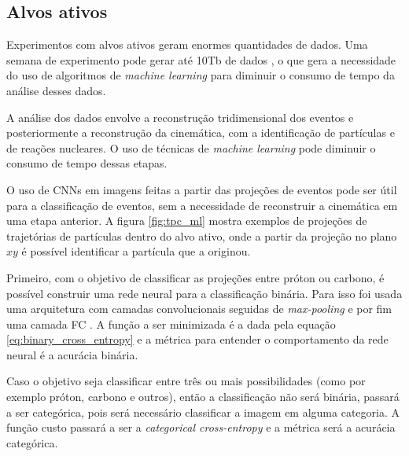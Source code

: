 \documentclass[a4paper,12pt,oneside]{book}
\begin{document}
\begin{appendices}
\section{Alvos ativos}

\par Experimentos com alvos ativos geram enormes quantidades de dados. Uma semana de experimento pode gerar até 10Tb de dados \cite{KUCHERAML}, o que gera a necessidade do uso de algoritmos de \textit{machine learning} para diminuir o consumo de tempo da análise desses dados.

\par A análise dos dados envolve a reconstrução tridimensional dos eventos e posteriormente a reconstrução da cinemática, com a identificação de partículas e de reações nucleares. O uso de técnicas de \textit{machine learning} pode diminuir o consumo de tempo dessas etapas.

\par O uso de CNNs em imagens feitas a partir das projeções de eventos pode ser útil para a classificação de eventos, sem a necessidade de reconstruir a cinemática em uma etapa anterior. A figura \ref{fig:tpc_ml} mostra exemplos de projeções de trajetórias de partículas dentro do alvo ativo, onde a partir da projeção no plano $xy$ é possível identificar a partícula que a originou.

\par Primeiro, com o objetivo de classificar as projeções entre próton ou carbono, é possível construir uma rede neural para a classificação binária. Para isso foi usada uma arquitetura com camadas convolucionais seguidas de \textit{max-pooling} e por fim uma camada FC \cite{KUCHERAML}. A função a ser minimizada é a dada pela equação \ref{eq:binary_cross_entropy} e a métrica para entender o comportamento da rede neural é a acurácia binária.

\par Caso o objetivo seja classificar entre três ou mais possibilidades (como por exemplo próton, carbono e outros), então a classificação não será binária, passará a ser categórica, pois será necessário classificar a imagem em alguma categoria. A função custo passará a ser a \textit{categorical cross-entropy} e a métrica será a acurácia categórica.


\end{appendices}
\end{document}
